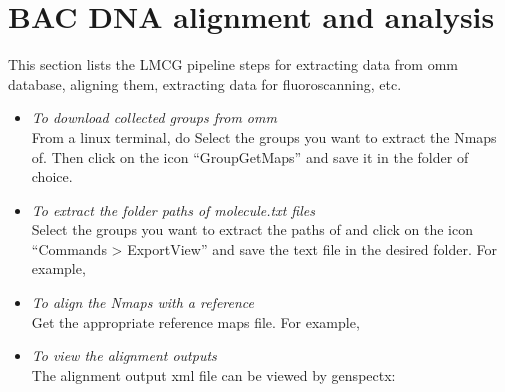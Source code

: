 \documentclass[11pt]{article}
\begin{document}
\section{BAC DNA alignment and analysis}
This section lists the LMCG pipeline steps for extracting data from omm database, aligning them, extracting data for fluoroscanning, etc. 
\begin{itemize}
\item \emph{To download collected groups from omm}\\
From a linux terminal, do
Select the groups you want to extract the Nmaps of. Then click on the icon ``GroupGetMaps'' and save it in the folder of choice. 

\item \emph{To extract the folder paths of molecule.txt files}\\
Select the groups you want to extract the paths of and click on the icon ``Commands > ExportView'' and save the text file in the desired folder. For example, 

\item \emph{To align the Nmaps with a reference}\\
Get the appropriate reference maps file. For example,

\item \emph{To view the alignment outputs}\\
The alignment output xml file can be viewed by genspectx:


\end{itemize}
\end{document}

